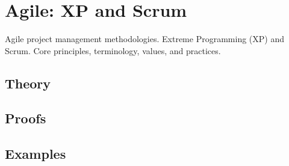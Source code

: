 
\section{Agile: XP and Scrum}
\label{sec:2.6.06-agile-xp-scrum}

\begin{ticket}
Agile project management methodologies. Extreme Programming (XP) and Scrum. Core principles, terminology, values, and practices.
\end{ticket}

\subsection*{Theory}

\subsection*{Proofs}

\subsection*{Examples}
